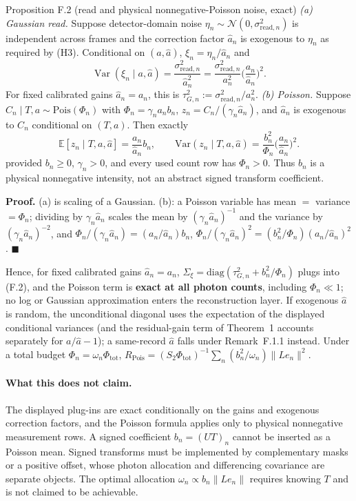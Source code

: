 \begin{namedthm}{Proposition F.2 (read and physical nonnegative-Poisson noise, exact)}
\emph{(a) Gaussian read.} Suppose detector-domain noise $\eta_n\sim\mathcal N(0,\sigma_{\mathrm{read},n}^2)$ is independent across frames and the correction factor $\hat a_n$ is exogenous to $\eta_n$ as required by (H3). Conditional on $(a,\hat a)$, $\xi_n=\eta_n/\hat a_n$ and
\[
\operatorname{Var}(\xi_n\mid a,\hat a)=\frac{\sigma_{\mathrm{read},n}^2}{\hat a_n^2}=\frac{\sigma_{\mathrm{read},n}^2}{a_n^2}\Big(\frac{a_n}{\hat a_n}\Big)^2.
\]
For fixed calibrated gains $\hat a_n=a_n$, this is $\tau_{G,n}^2:=\sigma_{\mathrm{read},n}^2/a_n^2$. \emph{(b) Poisson.} Suppose $C_n\mid T,a\sim\mathrm{Pois}(\Phi_n)$ with $\Phi_n=\gamma_n a_n b_n$, $z_n=C_n/(\gamma_n\hat a_n)$, and $\hat a_n$ is exogenous to $C_n$ conditional on $(T,a)$. Then exactly
\begin{equation}
\mathbb{E}[z_n\mid T,a,\hat a]=\frac{a_n}{\hat a_n}b_n,\qquad \mathrm{Var}(z_n\mid T,a,\hat a)=\frac{b_n^2}{\Phi_n}\Big(\frac{a_n}{\hat a_n}\Big)^2. \tag{F.5}
\end{equation}
provided $b_n\ge0$, $\gamma_n>0$, and every used count row has $\Phi_n>0$. Thus $b_n$ is a physical nonnegative intensity, not an abstract signed transform coefficient.
\end{namedthm}

\noindent\textbf{Proof.} (a) is scaling of a Gaussian. (b): a Poisson variable has mean $=$ variance $=\Phi_n$; dividing by $\gamma_n\hat a_n$ scales the mean by $(\gamma_n\hat a_n)^{-1}$ and the variance by $(\gamma_n\hat a_n)^{-2}$, and $\Phi_n/(\gamma_n\hat a_n)= (a_n/\hat a_n) b_n$, $\Phi_n/(\gamma_n\hat a_n)^2=(b_n^2/\Phi_n)(a_n/\hat a_n)^2$. \hfill$\blacksquare$

Hence, for fixed calibrated gains $\hat a_n=a_n$, $\Sigma_\xi=\mathrm{diag}(\tau_{G,n}^2+b_n^2/\Phi_n)$ plugs into (F.2), and the Poisson term is \textbf{exact at all photon counts}, including $\Phi_n\ll1$; no log or Gaussian approximation enters the reconstruction layer. If exogenous $\hat a$ is random, the unconditional diagonal uses the expectation of the displayed conditional variances (and the residual-gain term of Theorem~1 accounts separately for $a/\hat a-1$); a same-record $\hat a$ falls under Remark~F.1.1 instead. Under a total budget $\Phi_n=\omega_n\Phi_{\mathrm{tot}}$, $R_{\mathrm{Pois}}=(S_2\Phi_{\mathrm{tot}})^{-1}\sum_n(b_n^2/\omega_n)\|Le_n\|^2$.

\paragraph{What this does not claim.} The displayed plug-ins are exact conditionally on the gains and exogenous correction factors, and the Poisson formula applies only to physical nonnegative measurement rows. A signed coefficient $b_n=(UT)_n$ cannot be inserted as a Poisson mean. Signed transforms must be implemented by complementary masks or a positive offset, whose photon allocation and differencing covariance are separate objects. The optimal allocation $\omega_n\propto b_n\|Le_n\|$ requires knowing $T$ and is not claimed to be achievable.

